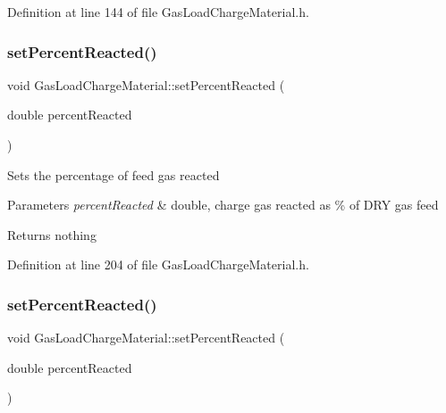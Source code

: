 Definition at line 144 of file Gas\+Load\+Charge\+Material.\+h.

\mbox{\label{class_gas_load_charge_material_a7142cb6bbfba53d640dd6f1590fe32f6}} 
\subsubsection{\texorpdfstring{set\+Percent\+Reacted()}{setPercentReacted()}\hspace{0.1cm}{\footnotesize\ttfamily [1/3]}}
{\footnotesize\ttfamily void Gas\+Load\+Charge\+Material\+::set\+Percent\+Reacted (\begin{DoxyParamCaption}\item[{double}]{percent\+Reacted }\end{DoxyParamCaption})\hspace{0.3cm}{\ttfamily [inline]}}

Sets the percentage of feed gas reacted


\begin{DoxyParams}{Parameters}
{\em percent\+Reacted} & double, charge gas reacted as \% of D\+RY gas feed\\
\hline
\end{DoxyParams}
\begin{DoxyReturn}{Returns}
nothing 
\end{DoxyReturn}


Definition at line 204 of file Gas\+Load\+Charge\+Material.\+h.

\mbox{\label{class_gas_load_charge_material_a7142cb6bbfba53d640dd6f1590fe32f6}} 
\subsubsection{\texorpdfstring{set\+Percent\+Reacted()}{setPercentReacted()}\hspace{0.1cm}{\footnotesize\ttfamily [2/3]}}
{\footnotesize\ttfamily void Gas\+Load\+Charge\+Material\+::set\+Percent\+Reacted (\begin{DoxyParamCaption}\item[{double}]{percent\+Reacted }\end{DoxyParamCaption})\hspace{0.3cm}{\ttfamily [inline]}}

